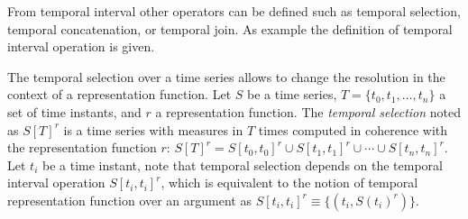 From temporal interval other operators can be defined such as temporal
selection, temporal concatenation, or temporal join. As example the
definition of temporal interval operation is given.


The temporal selection over a time series allows to change the
resolution in the context of a representation function.  Let $S$ be a
time series, $T=\{t_0,t_1,\dotsc,t_n\}$ a set of time instants, and
$r$ a representation function. The \emph{temporal selection} noted as
$S[T]^r$ is a time series with measures in $T$ times computed in
coherence with the representation function $r$: $S[T]^r = S[t_0,t_0]^r
\cup S[t_1,t_1]^r \cup \dotsb \cup S[t_n,t_n]^r$. Let $t_i$ be a time
instant, note that temporal selection depends on the temporal interval
operation $S[t_i,t_i]^r$, which is equivalent to the notion of
temporal representation function over an argument as $S[t_i,t_i]^r
\equiv \{ (t_i, S(t_i)^r) \}$.


%






